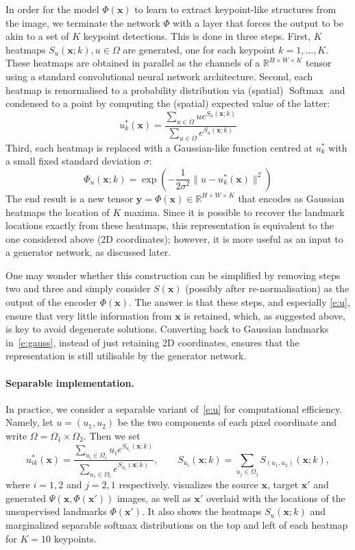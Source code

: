 \documentclass{article}
\newcommand{\bx}{\mathbf{x}}
\newcommand{\by}{\mathbf{y}}
\begin{document}
In order for the model $\Phi(\bx)$ to learn to extract keypoint-like structures from the image, we terminate the network $\Phi$ with a layer that forces the output to be akin to a set of $K$ keypoint detections. This is done in three steps. First, $K$ heatmaps $S_u(\bx;k), u\in\Omega$ are generated, one for each keypoint $k=1,\dots,K$. These heatmaps are obtained in parallel as the channels of a $\mathbb{R}^{H\times W\times K}$ tensor using a standard convolutional neural network architecture. Second, each heatmap is renormalised to a probability distribution via (spatial) $\operatorname{Softmax}$ and condensed to a point by computing the (spatial) expected value of the latter:
\begin{equation}\label{e:u}
  u^*_k(\bx)
  =
  \frac
  {\sum_{u\in\Omega} u e^{S_u(\bx;k)}}
  {\sum_{u\in\Omega}e^{S_u(\bx;k)}}
\end{equation}
Third, each heatmap is replaced with a Gaussian-like function centred at $u_k^*$ with a small fixed standard deviation $\sigma$:
\begin{equation}\label{e:gauss}
  \Phi_u(\bx;k) = \exp\left(
  -\frac{1}{2\sigma^2}
  \|
  u - u^*_k(\bx)
  \|^2
  \right)
\end{equation}
The end result is a new tensor $\by=\Phi(\bx) \in \mathbb{R}^{H\times W\times K}$ that encodes as Gaussian heatmaps the location of $K$ maxima. Since it is possible to recover the landmark locations exactly from these heatmaps, this representation is equivalent to the one considered above (2D coordinates); however, it is more useful as an input to a generator network, as discussed later.


One may wonder whether this construction can be simplified by removing steps two and three and simply consider $S(\bx)$ (possibly after re-normalisation) as the output of the encoder $\Phi(\bx)$. The answer is that these steps, and especially \cref{e:u}, ensure that very little information from $\bx$ is retained, which, as suggested above, is key to avoid degenerate solutions. Converting back to Gaussian landmarks in~\cref{e:gauss}, instead of just retaining 2D coordinates, ensures that the representation is still utilisable by the generator network.


\paragraph{Separable implementation.}


In practice, we consider a separable variant of~\cref{e:u} for computational efficiency. Namely, let $u=(u_1,u_2)$ be the two components of each pixel coordinate and write $\Omega = \Omega_1\times \Omega_2$. Then we set
$$
u_{ik}^*(\bx)
  =
  \frac
  {\sum_{u_i\in\Omega_i} u_i e^{S_{u_i}(\bx;k)}}
  {\sum_{u_i\in\Omega_i}e^{S_{u_i}(\bx;k)}},
  \qquad
  S_{u_i}(\bx;k) = \sum_{u_j\in\Omega_j}
  S_{(u_1,u_2)}(\bx;k),
$$
where $i=1,2$ and $j=2,1$ respectively.  visualizes the source $\bx$, target $\bx'$ and generated $\Psi(\bx,\Phi(\bx'))$ images, as well as $\bx'$ overlaid with the locations of the unsupervised landmarks $\Phi(\bx')$. It also shows the heatmaps $S_u(\bx;k)$ and marginalized separable softmax distributions on the top and left of each heatmap for $K=10$ keypoints.
\end{document}
